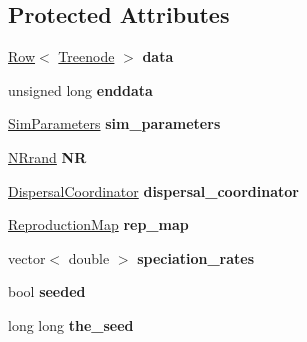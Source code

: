 \subsection*{Protected Attributes}
\begin{DoxyCompactItemize}
\item 
\hyperlink{class_row}{Row}$<$ \hyperlink{class_treenode}{Treenode} $>$ {\bfseries data}\hypertarget{class_tree_a59b96b790945010fda9b907df51038be}{}\label{class_tree_a59b96b790945010fda9b907df51038be}

\item 
unsigned long {\bfseries enddata}\hypertarget{class_tree_a50344999e6b64d15eef935b1f6023471}{}\label{class_tree_a50344999e6b64d15eef935b1f6023471}

\item 
\hyperlink{struct_sim_parameters}{Sim\+Parameters} {\bfseries sim\+\_\+parameters}\hypertarget{class_tree_a63c399793a209332ad0f5da7fc830d56}{}\label{class_tree_a63c399793a209332ad0f5da7fc830d56}

\item 
\hyperlink{class_n_rrand}{N\+Rrand} {\bfseries NR}\hypertarget{class_tree_aa7df162306777b040a9a2aac543e6801}{}\label{class_tree_aa7df162306777b040a9a2aac543e6801}

\item 
\hyperlink{class_dispersal_coordinator}{Dispersal\+Coordinator} {\bfseries dispersal\+\_\+coordinator}\hypertarget{class_tree_afbf25a881b31ea6558bb9dc48c431a73}{}\label{class_tree_afbf25a881b31ea6558bb9dc48c431a73}

\item 
\hyperlink{class_reproduction_map}{Reproduction\+Map} {\bfseries rep\+\_\+map}\hypertarget{class_tree_a7a85301c230febe654c002695828c9a9}{}\label{class_tree_a7a85301c230febe654c002695828c9a9}

\item 
vector$<$ double $>$ {\bfseries speciation\+\_\+rates}\hypertarget{class_tree_a702ccb094de94922b77548d50f025c8f}{}\label{class_tree_a702ccb094de94922b77548d50f025c8f}

\item 
bool {\bfseries seeded}\hypertarget{class_tree_a78935befd45946b8e69023bffca59c1d}{}\label{class_tree_a78935befd45946b8e69023bffca59c1d}

\item 
long long {\bfseries the\+\_\+seed}\hypertarget{class_tree_acf483ed0a44629c9aa4690a08017ee35}{}\label{class_tree_acf483ed0a44629c9aa4690a08017ee35}


\end{DoxyCompactItemize}
